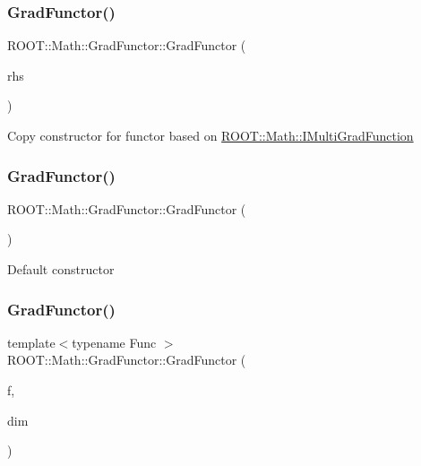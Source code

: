 \subsubsection{\texorpdfstring{GradFunctor()}{GradFunctor()}\hspace{0.1cm}{\footnotesize\ttfamily [10/15]}}
{\footnotesize\ttfamily R\+O\+O\+T\+::\+Math\+::\+Grad\+Functor\+::\+Grad\+Functor (\begin{DoxyParamCaption}\item[{const \mbox{\hyperlink{classROOT_1_1Math_1_1GradFunctor}{Grad\+Functor}} \&}]{rhs }\end{DoxyParamCaption})\hspace{0.3cm}{\ttfamily [inline]}}

Copy constructor for functor based on \mbox{\hyperlink{namespaceROOT_1_1Math_a014e019aaf9304a00e9231bd9ed232fb}{R\+O\+O\+T\+::\+Math\+::\+I\+Multi\+Grad\+Function}} \mbox{\label{classROOT_1_1Math_1_1GradFunctor_a68c75192981688e292ee84be652a8ec4}} 
\subsubsection{\texorpdfstring{GradFunctor()}{GradFunctor()}\hspace{0.1cm}{\footnotesize\ttfamily [11/15]}}
{\footnotesize\ttfamily R\+O\+O\+T\+::\+Math\+::\+Grad\+Functor\+::\+Grad\+Functor (\begin{DoxyParamCaption}{ }\end{DoxyParamCaption})\hspace{0.3cm}{\ttfamily [inline]}}

Default constructor \mbox{\label{classROOT_1_1Math_1_1GradFunctor_a9cdbcd3d49494b4209524b3c5b3172d2}} 
\subsubsection{\texorpdfstring{GradFunctor()}{GradFunctor()}\hspace{0.1cm}{\footnotesize\ttfamily [12/15]}}
{\footnotesize\ttfamily template$<$typename Func $>$ \\
R\+O\+O\+T\+::\+Math\+::\+Grad\+Functor\+::\+Grad\+Functor (\begin{DoxyParamCaption}\item[{const Func \&}]{f,  }\item[{unsigned int}]{dim }\end{DoxyParamCaption})\hspace{0.3cm}{\ttfamily [inline]}}

